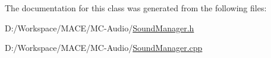 The documentation for this class was generated from the following files\+:\begin{DoxyCompactItemize}
\item 
D\+:/\+Workspace/\+M\+A\+C\+E/\+M\+C-\/\+Audio/\hyperlink{_sound_manager_8h}{Sound\+Manager.\+h}\item 
D\+:/\+Workspace/\+M\+A\+C\+E/\+M\+C-\/\+Audio/\hyperlink{_sound_manager_8cpp}{Sound\+Manager.\+cpp}\end{DoxyCompactItemize}
